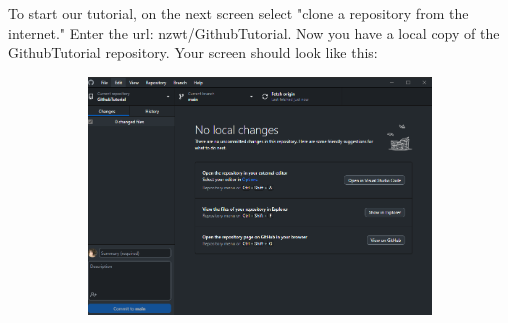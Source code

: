 \documentclass[10pt,twocolumn]{article}
\begin{document}
    To start our tutorial, on the next screen select "clone a repository from the internet." Enter the url: nzwt/GithubTutorial. Now you have a local copy of the GithubTutorial repository. Your screen should look like this:
    \begin{figure}
        \centering
        
\begin{figure}
    \centering
        \includegraphics[width=1\linewidth]{MainScreen.png}
        \end{figure}
        
        
    \end{figure}
\end{document}
